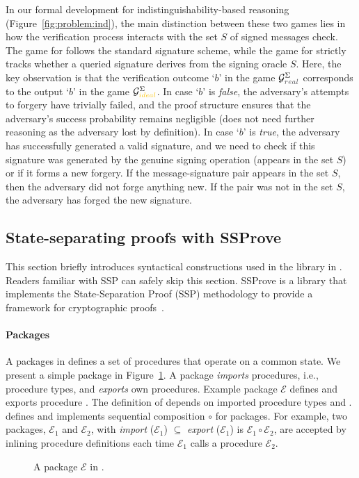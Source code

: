 In our formal development for indistinguishability-based reasoning (Figure~\ref{fig:problem:ind}), 
the main distinction between these two games lies in how the verification process 
interacts with the set $S$ of signed messages check. 
%
The game for \real follows the standard signature scheme, 
while the game for \ideal strictly tracks whether a queried signature derives from the signing oracle $S$. 
%
Here, the key observation is that the verification outcome `$b$’ in the game $\mathcal{G}_{\real}^{\Sigma}$ 
corresponds to the output `$b$’ in the game $\mathcal{G}_{\ideal}^{\Sigma}$. 
%
In case `$b$’ is \emph{false}, the adversary's attempts to forgery have trivially failed, and the proof structure ensures that 
the adversary's success probability remains negligible (does not need further reasoning as the adversary lost by definition). 
%
In case `$b$’ is \emph{true}, the adversary has successfully generated a valid signature, and we need to check if this 
signature was generated by the genuine signing operation (appears in the set $S$) or if it forms a new forgery. 
%
If the message-signature pair appears in the set $S$, then the adversary did not forge anything new. 
%
If the pair was not in the set $S$, the adversary has forged the new signature. 
%

\subsection{State-separating proofs with SSProve}
%
This section briefly introduces syntactical constructions used in the \ssprove library in \coq.
%
Readers familiar with SSP can safely skip this section.
%
SSProve is a \coq library that implements the State-Separation Proof (SSP) methodology to provide a framework for cryptographic proofs~\cite{ssp}.
%

\paragraph{Packages}
%
A packages in \ssprove defines a set of procedures that
operate on a common state.
%
We present a simple package in Figure~\ref{fig:package}.
%
A package \emph{imports} procedures, i.e., procedure types,
and \emph{exports} own procedures.
%
Example package $\mathcal{E}$ defines and exports procedure .
%
The definition of  depends on imported procedure types
 and .
%
\ssp defines and \ssprove implements sequential composition
$\circ$ for packages.
%
For example, two packages, $\mathcal{E}_1$ and $\mathcal{E}_2$, with 
\emph{import} ($\mathcal{E}_1$) $\subseteq$ \emph{export} ($\mathcal{E}_1$) is $\mathcal{E}_1 \circ \mathcal{E}_2$, 
are accepted by inlining procedure definitions each time $\mathcal{E}_1$ calls a procedure $\mathcal{E}_2$. 
%
%
\begin{figure}
  \centering
  
	\caption{A package $\mathcal{E}$ in \ssprove.}
  \label{fig:package}
\end{figure}
%

